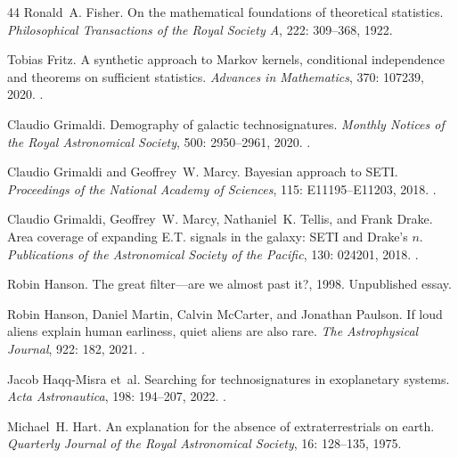 \documentclass[11pt,a4paper]{article}
\begin{document}
\begin{thebibliography}{44}
Ronald~A. Fisher.
\newblock On the mathematical foundations of theoretical statistics.
\newblock \emph{Philosophical Transactions of the Royal Society A},
  222: 309--368, 1922.

Tobias Fritz.
\newblock A synthetic approach to {Markov} kernels, conditional independence
  and theorems on sufficient statistics.
\newblock \emph{Advances in Mathematics}, 370: 107239, 2020.
\newblock {}.

Claudio Grimaldi.
\newblock Demography of galactic technosignatures.
\newblock \emph{Monthly Notices of the Royal Astronomical Society},
  500: 2950--2961, 2020.
\newblock {}.

Claudio Grimaldi and Geoffrey~W. Marcy.
\newblock Bayesian approach to {SETI}.
\newblock \emph{Proceedings of the National Academy of Sciences}, 115:
  E11195--E11203, 2018.
\newblock {}.

Claudio Grimaldi, Geoffrey~W. Marcy, Nathaniel~K. Tellis, and Frank Drake.
\newblock Area coverage of expanding {E.T.} signals in the galaxy: {SETI} and
  {Drake}'s $n$.
\newblock \emph{Publications of the Astronomical Society of the Pacific},
  130: 024201, 2018.
\newblock {}.

Robin Hanson.
\newblock The great filter---are we almost past it?, 1998.
\newblock Unpublished essay.

Robin Hanson, Daniel Martin, Calvin McCarter, and Jonathan Paulson.
\newblock If loud aliens explain human earliness, quiet aliens are also rare.
\newblock \emph{The Astrophysical Journal}, 922: 182, 2021.
\newblock {}.

Jacob Haqq-Misra et~al.
\newblock Searching for technosignatures in exoplanetary systems.
\newblock \emph{Acta Astronautica}, 198: 194--207, 2022.
\newblock {}.

Michael~H. Hart.
\newblock An explanation for the absence of extraterrestrials on earth.
\newblock \emph{Quarterly Journal of the Royal Astronomical Society},
  16: 128--135, 1975.


\end{thebibliography}
\end{document}
